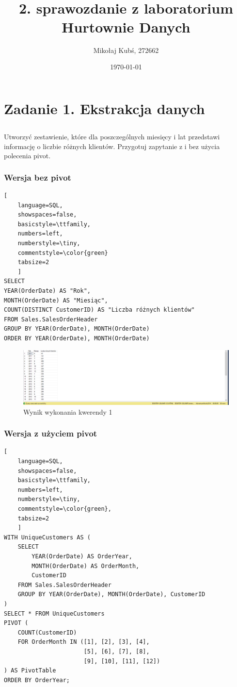 \documentclass[a4paper,12pt]{article}
\title{2. sprawozdanie z laboratorium Hurtownie Danych}
\author{Mikołaj Kubś, 272662}
\date{\today}
\begin{document}
\maketitle

\section{Zadanie 1. Ekstrakcja danych}

\subsection{}

Utworzyć zestawienie, które dla poszczególnych miesięcy i lat przedstawi informację o liczbie różnych klientów. Przygotuj zapytanie z i bez użycia polecenia pivot.

\subsubsection{Wersja bez pivot}

\begin{lstlisting}[
    language=SQL,
    showspaces=false,
    basicstyle=\ttfamily,
    numbers=left,
    numberstyle=\tiny,
    commentstyle=\color{green}
    tabsize=2
    ]
SELECT 
YEAR(OrderDate) AS "Rok", 
MONTH(OrderDate) AS "Miesiąc", 
COUNT(DISTINCT CustomerID) AS "Liczba różnych klientów"
FROM Sales.SalesOrderHeader
GROUP BY YEAR(OrderDate), MONTH(OrderDate)
ORDER BY YEAR(OrderDate), MONTH(OrderDate)
\end{lstlisting}

\begin{figure}[H]
    \centering
    \includegraphics[width=1.0\textwidth]{images/01_normal.png}
    \caption{Wynik wykonania kwerendy 1}
    \label{fig:1_normal}
\end{figure}

\subsubsection{Wersja z użyciem pivot}

\begin{lstlisting}[
    language=SQL,
    showspaces=false,
    basicstyle=\ttfamily,
    numbers=left,
    numberstyle=\tiny,
    commentstyle=\color{green},
    tabsize=2
    ]
WITH UniqueCustomers AS (
    SELECT 
        YEAR(OrderDate) AS OrderYear, 
        MONTH(OrderDate) AS OrderMonth, 
        CustomerID
    FROM Sales.SalesOrderHeader
    GROUP BY YEAR(OrderDate), MONTH(OrderDate), CustomerID
)
SELECT * FROM UniqueCustomers
PIVOT (
    COUNT(CustomerID) 
    FOR OrderMonth IN ([1], [2], [3], [4], 
                       [5], [6], [7], [8], 
                       [9], [10], [11], [12])
) AS PivotTable
ORDER BY OrderYear;
\end{lstlisting}
\end{document}
